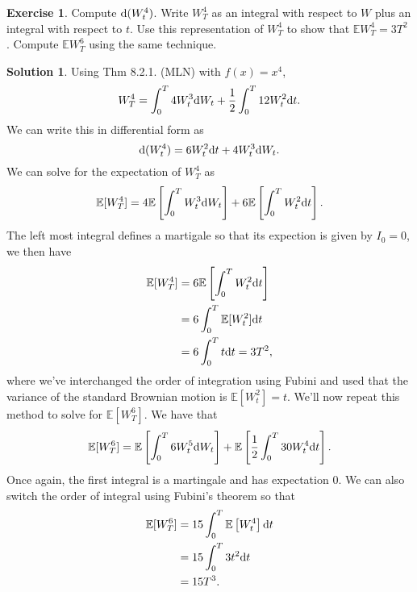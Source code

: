 \documentclass[12pt]{article}
\newcommand{\Expect}{\mathbb{E}}
\theoremstyle{definition}
\newtheorem{exer}{Exercise}
\newtheorem{sol}{Solution}
\theoremstyle{remark}
\def\d{{\rm d}}
\begin{document}
\begin{exer}
    Compute $\d (W_{t}^{4})$. Write $W_{T}^{4}$ as an integral with respect to $W$ plus an integral with respect
to $t$. Use this representation of $W_{T}^{4}$ to show that $\Expect W_{T}^{4} = 3T^{2}$ . Compute $\Expect W_{T}^{6}$ using the same technique.
\end{exer}

\begin{sol}
    Using Thm 8.2.1. (MLN) with $f(x) = x^{4}$,
\begin{equation*}
    W_{T}^{4} = \int_{0}^{T} 4 W_{t}^{3} \d W_{t} + \frac{1}{2} \int_{0}^{T} 12 W_{t}^{2} \d t.
\end{equation*}
We can write this in differential form as
\begin{equation*}
    \d ( W_{t}^{4} ) = 6 W_{t}^{2} \d t +  4 W_{t}^{3} \d W_{t}.  
\end{equation*}
We can solve for the expectation of $W_{T}^{4}$ as
\begin{align*}
    \Expect[ W_{T}^{4} ] = 4\Expect \left[\int_{0}^{T} W_{t}^{3} \d W_{t}  \right] + 6 \Expect \left[\int_{0}^{T} W_{t}^{2} \d t \right].
\end{align*}
The left most integral defines a martigale so that its expection is given by $I_{0} = 0$, we then have
\begin{align*}
    \Expect[ W_{T}^{4} ] &= 6 \Expect \left[\int_{0}^{T} W_{t}^{2} \d t \right]\\
                         &= 6 \int_{0}^{T} \Expect[ W_{t}^{2} ] \d t\\
                         &= 6 \int_{0}^{T} t \d t = 3 T^{2},
\end{align*}
where we've interchanged the order of integration using Fubini and used that the variance of the standard Brownian motion is $\Expect[ W_{t}^{2} ] = t$. We'll now repeat this method to solve for $\Expect[W_{T}^{6}]$. We have that
\begin{equation*}
    \Expect[ W_{T}^{6} ] = \Expect \left[ \int_{0}^{T} 6 W_{t}^{5} \d W_{t} \right] + \Expect \left[ \frac{1}{2} \int_{0}^{T} 30 W_{t}^{4} \d t \right].
\end{equation*}
Once again, the first integral is a martingale and has expectation 0. We can also switch the order of integral using Fubini's theorem so that
\begin{align*}
    \Expect[ W_{T}^{6} ] &= 15 \int_{0}^{T} \Expect \left[  W_{t}^{4}\right]  \d t\\ 
                         &= 15 \int_{0}^{T} 3t^{2} \d t \\
                         &= 15 T^{3}.
\end{align*}
\end{sol}
\end{document}
